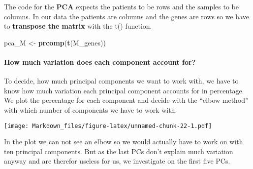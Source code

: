\documentclass[]{article}
\newenvironment{Shaded}{\begin{snugshade}}{\end{snugshade}}
\newcommand{\KeywordTok}[1]{\textcolor[rgb]{0.13,0.29,0.53}{\textbf{#1}}}
\newcommand{\DataTypeTok}[1]{\textcolor[rgb]{0.13,0.29,0.53}{#1}}
\newcommand{\DecValTok}[1]{\textcolor[rgb]{0.00,0.00,0.81}{#1}}
\newcommand{\StringTok}[1]{\textcolor[rgb]{0.31,0.60,0.02}{#1}}
\newcommand{\OperatorTok}[1]{\textcolor[rgb]{0.81,0.36,0.00}{\textbf{#1}}}
\newcommand{\NormalTok}[1]{#1}
\let\oldparagraph\paragraph
\renewcommand{\paragraph}[1]{\oldparagraph{#1}\mbox{}}
\begin{document}
The code for the \textbf{PCA} expects the patients to be rows and the
samples to be columns. In our data the patients are columns and the
genes are rows so we have to \textbf{transpose the matrix} with the t()
function.

\begin{Shaded}
\begin{Highlighting}[]
\NormalTok{pca_M <-}\StringTok{ }\KeywordTok{prcomp}\NormalTok{(}\KeywordTok{t}\NormalTok{(M_genes))}
\end{Highlighting}
\end{Shaded}

\paragraph{How much variation does each component account
for?}\label{how-much-variation-does-each-component-account-for}

To decide, how much principal components we want to work with, we have
to know how much variation each principal component accounts for in
percentage. We plot the percentage for each component and decide with
the ``elbow method'' with which number of components we have to work
with.

\begin{Shaded}
\end{Shaded}

\texttt{[image: Markdown\_files/figure-latex/unnamed-chunk-22-1.pdf]}

In the plot we can not see an elbow so we would actually have to work on
with ten principal components. But as the last PCs don't explain much
variation anyway and are therefor useless for us, we investigate on the
first five PCs.
\end{document}
